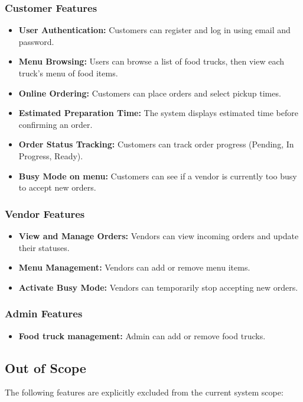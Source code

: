 \documentclass[12pt,a4paper]{article}
\begin{document}
\subsubsection{Customer Features}
\begin{itemize}[leftmargin=2em, itemsep=6pt]
    \item \textbf{User Authentication:} Customers can register and log in using email and password.
    \item \textbf{Menu Browsing:} Users can browse a list of food trucks, then view each truck's menu of food items.
    \item \textbf{Online Ordering:} Customers can place orders and select pickup times.
    \item \textbf{Estimated Preparation Time:} The system displays estimated time before confirming an order.
    \item \textbf{Order Status Tracking:} Customers can track order progress (Pending, In Progress, Ready).
    \item \textbf{Busy Mode on menu:} Customers can see if a vendor is currently too busy to accept new orders.
\end{itemize}

\subsubsection{Vendor Features}
\begin{itemize}[leftmargin=2em, itemsep=6pt]
    \item \textbf{View and Manage Orders:} Vendors can view incoming orders and update their statuses.
    \item \textbf{Menu Management:} Vendors can add or remove menu items.
    \item \textbf{Activate Busy Mode:} Vendors can temporarily stop accepting new orders.
\end{itemize}

\subsubsection{Admin Features}
\begin{itemize}[leftmargin=2em, itemsep=6pt]
    \item \textbf{Food truck management:} Admin can add or remove food trucks.
\end{itemize}

\subsection{Out of Scope}
The following features are explicitly excluded from the current system scope:
\end{document}

